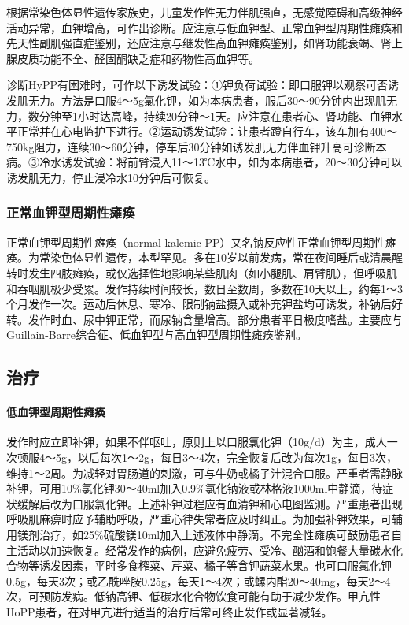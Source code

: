 根据常染色体显性遗传家族史，儿童发作性无力伴肌强直，无感觉障碍和高级神经活动异常，血钾增高，可作出诊断。应注意与低血钾型、正常血钾型周期性瘫痪和先天性副肌强直症鉴别，还应注意与继发性高血钾瘫痪鉴别，如肾功能衰竭、肾上腺皮质功能不全、醛固酮缺乏症和药物性高血钾等。

诊断HyPP有困难时，可作以下诱发试验：①钾负荷试验：即口服钾以观察可否诱发肌无力。方法是口服4～5g氯化钾，如为本病患者，服后30～90分钟内出现肌无力，数分钟至1小时达高峰，持续20分钟～1天。应注意在患者心、肾功能、血钾水平正常并在心电监护下进行。②运动诱发试验：让患者蹬自行车，该车加有400～750kg阻力，连续30～60分钟，停车后30分钟如诱发肌无力伴血钾升高可诊断本病。③冷水诱发试验：将前臂浸入11～13℃水中，如为本病患者，20～30分钟可以诱发肌无力，停止浸冷水10分钟后可恢复。

\subsubsection{正常血钾型周期性瘫痪}

正常血钾型周期性瘫痪（normal kalemic
PP）又名钠反应性正常血钾型周期性瘫痪。为常染色体显性遗传，本型罕见。多在10岁以前发病，常在夜间睡后或清晨醒转时发生四肢瘫痪，或仅选择性地影响某些肌肉（如小腿肌、肩臂肌），但呼吸肌和吞咽肌极少受累。发作持续时间较长，数日至数周，多数在10天以上，约每1～3个月发作一次。运动后休息、寒冷、限制钠盐摄入或补充钾盐均可诱发，补钠后好转。发作时血、尿中钾正常，而尿钠含量增高。部分患者平日极度嗜盐。主要应与Guillain-Barre综合征、低血钾型与高血钾型周期性瘫痪鉴别。

\subsection{治疗}

\paragraph{低血钾型周期性瘫痪}

发作时应立即补钾，如果不伴呕吐，原则上以口服氯化钾（10g/d）为主，成人一次顿服4～5g，以后每次1～2g，每日3～4次，完全恢复后改为每次1g，每日3次，维持1～2周。为减轻对胃肠道的刺激，可与牛奶或橘子汁混合口服。严重者需静脉补钾，可用10\%氯化钾30～40ml加入0.9\%氯化钠液或林格液1000ml中静滴，待症状缓解后改为口服氯化钾。上述补钾过程应有血清钾和心电图监测。严重患者出现呼吸肌麻痹时应予辅助呼吸，严重心律失常者应及时纠正。为加强补钾效果，可辅用镁剂治疗，如25\%硫酸镁10ml加入上述液体中静滴。不完全性瘫痪可鼓励患者自主活动以加速恢复。经常发作的病例，应避免疲劳、受冷、酗酒和饱餐大量碳水化合物等诱发因素，平时多食榨菜、芹菜、橘子等含钾蔬菜水果。也可口服氯化钾0.5g，每天3次；或乙酰唑胺0.25g，每天1～4次；或螺内酯20～40mg，每天2～4次，可预防发病。低钠高钾、低碳水化合物饮食可能有助于减少发作。甲亢性HoPP患者，在对甲亢进行适当的治疗后常可终止发作或显著减轻。

